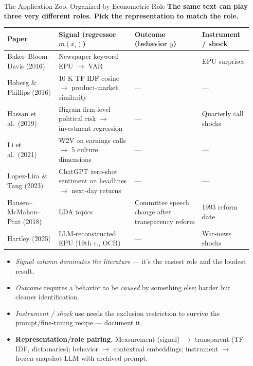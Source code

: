 \begin{frame}{The Application Zoo, Organized by Econometric Role}
\textbf{The same text can play three very different roles. Pick the representation to match the role.}
\medskip

\begin{center}
\renewcommand{\arraystretch}{1.25}
\scriptsize
\begin{tabular}{|p{3.2cm}|p{3.7cm}|p{3.5cm}|p{3.2cm}|}
\hline
\textbf{Paper} & \textbf{Signal (regressor $m(x_i)$)} & \textbf{Outcome (behavior $y$)} & \textbf{Instrument / shock} \\
\hline
Baker--Bloom--Davis (2016) & Newspaper keyword EPU $\to$ VAR & --- & EPU surprises \\
\hline
Hoberg \& Phillips (2016) & 10-K TF-IDF cosine $\to$ product-market similarity & --- & --- \\
\hline
Hassan et al.\ (2019) & Bigram firm-level political risk $\to$ investment regression & --- & Quarterly call shocks \\
\hline
Li et al.\ (2021) & W2V on earnings calls $\to$ 5 culture dimensions & --- & --- \\
\hline
Lopez-Lira \& Tang (2023) & ChatGPT zero-shot sentiment on headlines $\to$ next-day returns & --- & --- \\
\hline
Hansen--McMahon--Prat (2018) & LDA topics & Committee speech change after transparency reform & 1993 reform date \\
\hline
Hartley (2025) & LLM-reconstructed EPU (19th c., OCR) & --- & War-news shocks \\
\hline
\end{tabular}
\end{center}

\smallskip
\footnotesize
\begin{itemize}\itemsep0pt
\item \emph{Signal column dominates the literature} --- it's the easiest role and the loudest result.
\item \emph{Outcome} requires a behavior to be \emph{caused} by something else; harder but cleaner identification.
\item \emph{Instrument / shock} use needs the exclusion restriction to survive the prompt/fine-tuning recipe --- document it.
\item \textbf{Representation/role pairing.} Measurement (signal) $\to$ transparent (TF-IDF, dictionaries); behavior $\to$ contextual embeddings; instrument $\to$ frozen-snapshot LLM with archived prompt.
\end{itemize}
\end{frame}

